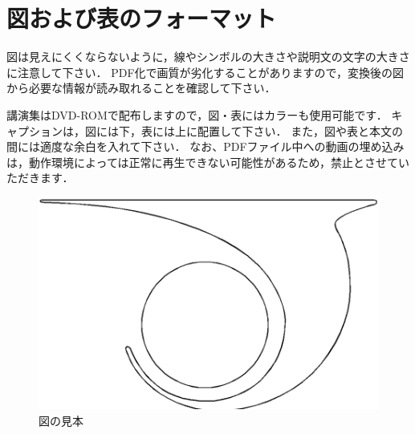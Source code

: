 \documentclass{jsass-ukaren}
\begin{document}
\vfil

\section{図および表のフォーマット}
  図は見えにくくならないように，線やシンボルの大きさや説明文の文字の大きさに注意して下さい．
  PDF化で画質が劣化することがありますので，変換後の図から必要な情報が読み取れることを確認して下さい．

  講演集はDVD-ROMで配布しますので，図・表にはカラーも使用可能です．
  キャプションは，図には下，表には上に配置して下さい．
  また，図や表と本文の間には適度な余白を入れて下さい．
  なお、PDFファイル中への動画の埋め込みは，動作環境によっては正常に再生できない可能性があるため，禁止とさせていただきます．

  \begin{figure}[H]
    \centering
    \includegraphics[width=0.75\linewidth]{figures/sample_image.png}
    \caption{図の見本}
    \label{fig:sample_image}
  \end{figure}


\nocite{article_ja_example}
\printbibliography[title=参考文献]
\end{document}
